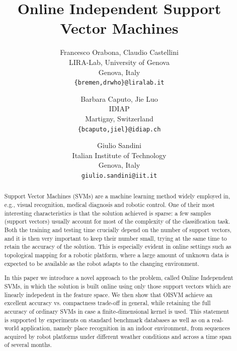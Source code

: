 \documentclass[10pt,twocolumn,letterpaper]{article}
\begin{document}

\title{Online Independent Support Vector Machines}

\author{
Francesco Orabona, Claudio Castellini\\
LIRA-Lab, University of Genova\\
Genova, Italy\\
{\tt\small \{bremen,drwho\}@liralab.it}
\and
Barbara Caputo, Jie Luo\\
IDIAP\\
Martigny, Switzerland\\
{\tt\small \{bcaputo,jiel\}@idiap.ch}
\and
Giulio Sandini\\
Italian Institute of Technology\\
Genova, Italy\\
{\tt\small giulio.sandini@iit.it}
}

\maketitle


\begin{abstract}

  Support Vector Machines (SVMs) are a machine learning method widely
  employed in, e.g., visual recognition, medical diagnosis and robotic
  control. One of their most interesting characteristics is that the
  solution achieved is sparse: a few samples (support vectors) usually
  account for most of the complexity of the classification task. Both
  the training and testing time crucially depend on the number of
  support vectors, and it is then very important to keep their number
  small, trying at the same time to retain the accuracy of the
  solution. This is especially evident in online settings such as
  topological mapping for a robotic platform, where a large amount of
  unknown data is expected to be available as the robot adapts to the
  changing environment.

  In this paper we introduce a novel approach to the problem, called
  Online Independent SVMs, in which the solution is built online using
  only those support vectors which are linearly indepedent in the
  feature space. We then show that OISVM achieve an excellent accuracy
  vs. compactness trade-off in general, while retaining the full
  accuracy of ordinary SVMs in case a finite-dimensional kernel is
  used. This statement is supported by experiments on standard
  benchmark databases as well as on a real-world application, namely
  place recognition in an indoor environment, from sequences acquired
  by robot platforms under different weather conditions and across a
  time span of several months.

\end{abstract}
\end{document}
